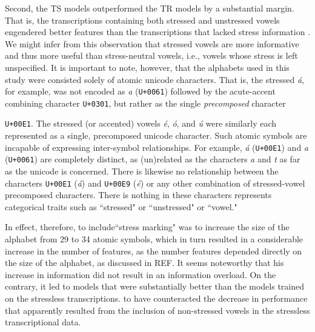 Second, the TS models outperformed the TR models by a substantial margin. That is, 
the transcriptions containing both stressed and unstressed vowels engendered better features than  the
transcriptions that lacked stress information . We might infer from this observation that stressed vowels are more informative and thus more useful than 
stress-neutral vowels, i.e., vowels whose stress is left unspecified.  It is important to note, however, that the alphabets used in this study were consisted solely of atomic unicode characters. That is, the stressed \textit{\'a}, 
for example, was not encoded as \textit{a} (\texttt{U+0061}) followed by the acute-accent combining character \texttt{U+0301}, but 
rather as the single \emph{precomposed} character{\texttt{U+00E1}. The stressed (or accented) vowels \textit{\'e}, \textit{\'o}, and \textit{\'u} were similarly each represented as a single, precomposed unicode character. 
Such atomic symbols are incapable of expressing inter-symbol relationships. For example, \textit{\'a} (\texttt{U+00E1}) and \textit{a} (\texttt{U+0061}) are completely distinct, as (un)related as the characters \textit{a} and \textit{t} as far as the unicode is concerned.
There is likewise
no relationship between the characters \texttt{U+00E1} (\textit{\'a}) and  \texttt{U+00E9} (\textit{\'e}) or any other combination of stressed-vowel precomposed characters. There is nothing in these characters represents categorical traits such as ``stressed" or ``unstressed" or ``vowel."  

In effect, therefore, to include``stress marking" was to increase the size of the alphabet from 29 to 34 atomic symbols, which
in turn resulted in a considerable increase in the number of features, as the number features depended 
directly on the size of the alphabet, as discussed in REF. It seems noteworthy that his increase in information did not result in an
information overload. On the contrary, it led to models that were substantially better than the models trained on the stressless transcriptions.  to have counteracted the decrease in 
performance that apparently resulted from the inclusion of non-stressed vowels in the stressless transcriptional data. 

}
